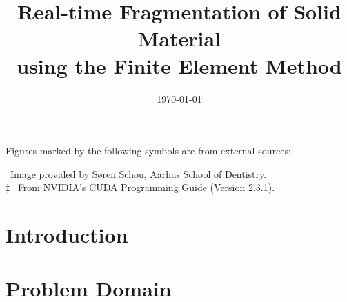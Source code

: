 \documentclass[a4paper,twoside,openright]{memoir}
\title{
  Real-time Fragmentation of Solid Material \\
  using the Finite Element Method
}
\date{\today}
\begin{document}
\pagestyle{empty}


\cleardoublepage

\thispagestyle{empty}


%
\cleardoublepage %

\pagestyle{plain}



\cleardoublepage
\thispagestyle{empty}

\cleardoublepage

\pagebreak %

\cleardoublepage
\tableofcontents*
\cleardoublepage
\listoffigures*
Figures marked by the following symbols are from external sources:
\begin{center}
\begin{minipage}{0.9\linewidth}
\textdagger \ Image provided by Søren Schou, Aarhus School of
Dentistry. \\
$\ddagger$ \ From NVIDIA's CUDA Programming Guide (Version 2.3.1).
\end{minipage}
\end{center}
\cleardoublepage
\listoftables*
\cleardoublepage
%
\pagebreak

\pagestyle{mystyle}


\chapter{Introduction}
\label{chapter:introduction}


\doubleblank

\chapter{Problem Domain}
\label{chapter:problem_domain}

\end{document}

